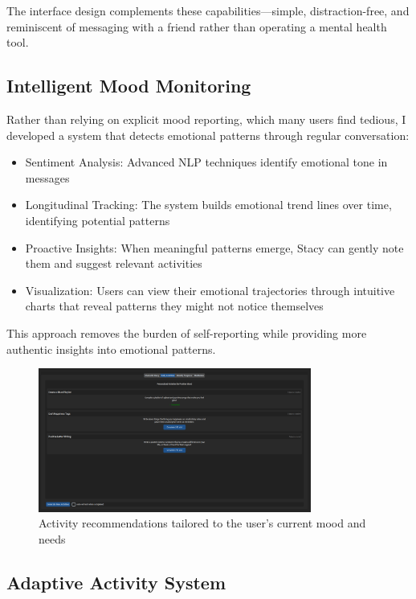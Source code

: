 \documentclass[12pt]{article}
\begin{document}
The interface design complements these capabilities—simple, distraction-free, and reminiscent of messaging with a friend rather than operating a mental health tool.

\subsection{Intelligent Mood Monitoring}

Rather than relying on explicit mood reporting, which many users find tedious, I developed a system that detects emotional patterns through regular conversation:

\begin{itemize}
    \item Sentiment Analysis: Advanced NLP techniques identify emotional tone in messages
    \item Longitudinal Tracking: The system builds emotional trend lines over time, identifying potential patterns
    \item Proactive Insights: When meaningful patterns emerge, Stacy can gently note them and suggest relevant activities
    \item Visualization: Users can view their emotional trajectories through intuitive charts that reveal patterns they might not notice themselves
\end{itemize}

This approach removes the burden of self-reporting while providing more authentic insights into emotional patterns.

\begin{figure}[H]
  \centering
  \includegraphics[width=0.8\textwidth]{../images/Activities.png}
  \caption{Activity recommendations tailored to the user's current mood and needs}
\end{figure}

\subsection{Adaptive Activity System}
\end{document}

